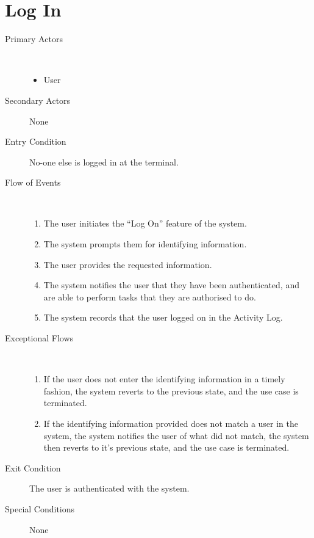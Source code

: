 \documentclass[a4paper,10pt]{report}
\begin{document}
\section{Log In}
\begin{description}
\item[Primary Actors] \
  \begin{itemize}
  \item User
  \end{itemize}
\item[Secondary Actors] None
\item[Entry Condition]
  No-one else is logged in at the terminal.
\item[Flow of Events] \
  \begin{enumerate}
  \item The user initiates the ``Log On'' feature of the system. 
  \item The system prompts them for identifying information.
  \item The user provides the requested information.
  \item The system notifies the user that they have been authenticated, and are able to perform tasks that they are authorised to do.
    \item The system records that the user logged on in the Activity Log.
  \end{enumerate}
\item[Exceptional Flows] \
  \begin{enumerate}
  \item If the user does not enter the identifying information in a timely fashion, the system reverts to the previous state, and the use case is terminated.
  \item If the identifying information provided does not match a user in the system, the system notifies the user of what did not match, the system then reverts to it's previous state, and the use case is terminated.
  \end{enumerate}
\item[Exit Condition]
  The user is authenticated with the system.
\item[Special Conditions] None
\end{description}
\end{document}
